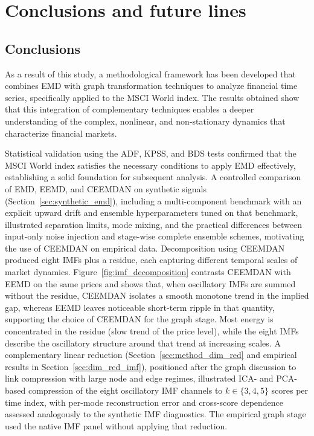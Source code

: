 \documentclass[11pt,a4paper]{article}
\begin{document}
\FloatBarrier

\section{Conclusions and future lines}
\label{conclfutu}

\subsection{Conclusions}
As a result of this study, a methodological framework has been developed that combines EMD with graph transformation techniques to analyze financial time series, specifically applied to the MSCI World index. The results obtained show that this integration of complementary techniques enables a deeper understanding of the complex, nonlinear, and non-stationary dynamics that characterize financial markets.

Statistical validation using the ADF, KPSS, and BDS tests confirmed that the MSCI World index satisfies the necessary conditions to apply EMD effectively, establishing a solid foundation for subsequent analysis. A controlled comparison of EMD, EEMD, and CEEMDAN on synthetic signals (Section~\ref{sec:synthetic_emd}), including a multi-component benchmark with an explicit upward drift and ensemble hyperparameters tuned on that benchmark, illustrated separation limits, mode mixing, and the practical differences between input-only noise injection and stage-wise complete ensemble schemes, motivating the use of CEEMDAN on empirical data. Decomposition using CEEMDAN produced eight IMFs plus a residue, each capturing different temporal scales of market dynamics. Figure~\ref{fig:imf_decomposition} contrasts CEEMDAN with EEMD on the same prices and shows that, when oscillatory IMFs are summed without the residue, CEEMDAN isolates a smooth monotone trend in the implied gap, whereas EEMD leaves noticeable short-term ripple in that quantity, supporting the choice of CEEMDAN for the graph stage. Most energy is concentrated in the residue (slow trend of the price level), while the eight IMFs describe the oscillatory structure around that trend at increasing scales. A complementary linear reduction (Section~\ref{sec:method_dim_red} and empirical results in Section~\ref{sec:dim_red_imf}), positioned after the graph discussion to link compression with large node and edge regimes, illustrated ICA- and PCA-based compression of the eight oscillatory IMF channels to $k\in\{3,4,5\}$ scores per time index, with per-mode reconstruction error and cross-score dependence assessed analogously to the synthetic IMF diagnostics. The empirical graph stage used the native IMF panel without applying that reduction.
\end{document}
